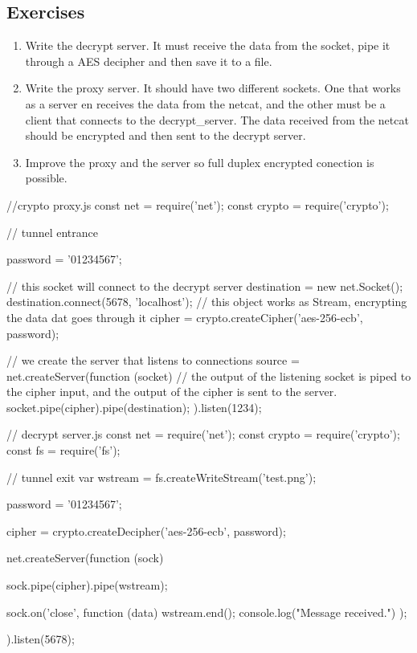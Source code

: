 \subsection{Exercises}
\begin{enumerate}
	\item Write the decrypt server. It must receive the data from the socket, pipe it through a AES decipher and then save it to a file.
	
	\item Write the proxy server. It should have two different sockets. One that works as a server en receives the data from the netcat, and the other must be a client that connects to the decrypt\_server. The data received from the netcat should be encrypted and then sent to the decrypt server.
	
	\item Improve the proxy and the server so full duplex encrypted conection is possible.
\end{enumerate}

\begin{js}
//crypto proxy.js
const net = require('net');
const crypto = require('crypto');

// tunnel entrance

password = '01234567';

// this socket will connect to the decrypt server
destination = new net.Socket();
destination.connect(5678, 'localhost');
// this object works as Stream, encrypting the data dat goes through it
cipher = crypto.createCipher('aes-256-ecb', password);

// we create the server that listens to connections
source = net.createServer(function (socket) {
    // the output of the listening socket is piped to the cipher input, and the output of the cipher is sent to the server.
    socket.pipe(cipher).pipe(destination);
}).listen(1234);
\end{js}


\begin{js}
// decrypt server.js
const net = require('net');
const crypto = require('crypto');
const fs = require('fs');

// tunnel exit
var wstream = fs.createWriteStream('test.png');

password = '01234567';

cipher = crypto.createDecipher('aes-256-ecb', password);

net.createServer(function (sock) {
    sock.pipe(cipher).pipe(wstream);

    sock.on('close', function (data) {
        wstream.end();
        console.log("Message received.")
    });
}).listen(5678);
\end{js}
